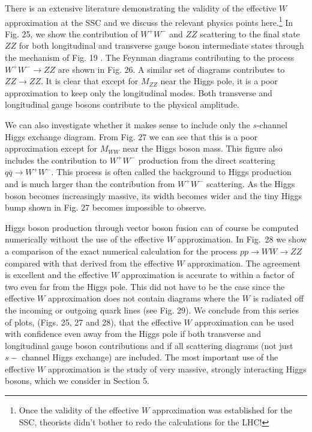 There is an extensive literature demonstrating the validity of
the effective $W$ approximation at the SSC and we discuss the
relevant physics  points here.\footnote{Once the validity of the effective
$W$ approximation was established for the SSC, theorists
didn't bother to redo the calculations for the LHC!}
In Fig. 25,  we show the contribution of $W^+W^-$ and $ZZ$
scattering
to the final state $ZZ$
for both longitudinal and transverse gauge boson intermediate states
 through the
mechanism of Fig. 19 .
The Feynman diagrams contributing to the process
$W^+W^-\rightarrow ZZ$ are shown in Fig. 26.   A similar set of diagrams
contributes to $ZZ\rightarrow ZZ$.
It is clear that except for $M_{ZZ}$ near the Higgs
pole, it is a poor approximation to keep only the longitudinal modes.
Both transverse and longitudinal gauge bosons contribute to the
physical amplitude.




We can also investigate whether it makes sense to include only
the $s$-channel Higgs exchange diagram.
 From Fig. 27
we can see that this
is a
poor approximation except for $M_{WW}$ near the Higgs boson mass.
This figure also includes the contribution to $W^+W^-$ production
from the direct scattering $q \overline{q}\rightarrow W^+W^-$. This
process is often called the background to Higgs production and
is much larger than the
contribution from $W^+W^-$ scattering.  As the Higgs boson becomes
increasingly massive, its width becomes wider and the tiny Higgs
bump shown in Fig. 27 becomes impossible to observe.

Higgs boson production through vector boson fusion
 can of course be computed numerically
without the use of the effective $W$ approximation.
In Fig.~28 we show a comparison of the exact numerical calculation
for the process $pp\rightarrow WW\rightarrow ZZ$ compared with
that derived from the effective $W$ approximation.
The agreement is excellent
and the effective $W$ approximation is accurate to within a
factor of two even far from the Higgs pole.\cite{abel,gun}
  This did not have
to be the case since
the effective $W$ approximation
does not contain diagrams where the $W$ is radiated off the
incoming or outgoing quark lines (see Fig. 29).
We conclude
from this series of plots, (Figs. 25, 27 and 28),
 that the effective $W$ approximation can be used with
confidence even away from the Higgs pole if both transverse and
longitudinal gauge boson contributions and if  all scattering diagrams
(not just $s-$ channel Higgs exchange) are included.
The most important use of the effective $W$ approximation is
the study of very massive, strongly interacting Higgs bosons, which we
consider in Section 5.

